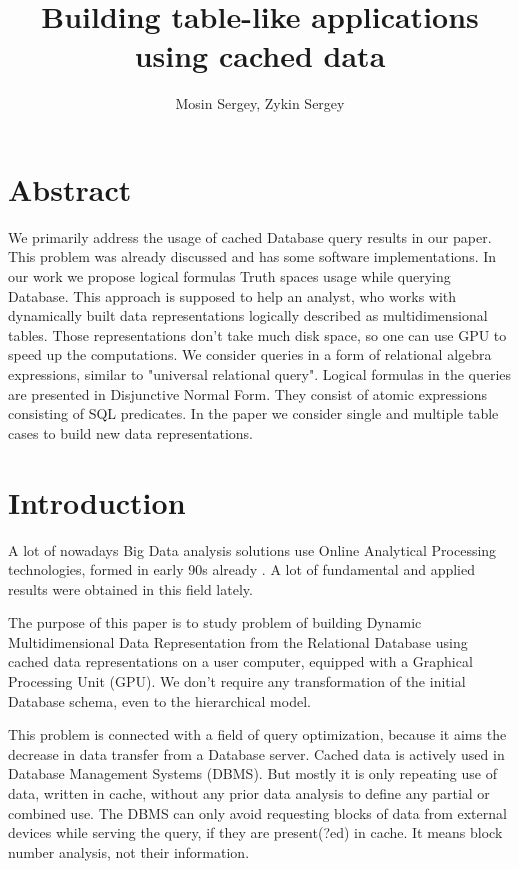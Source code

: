 \documentclass[10pt,a4paper]{article}
\author{Mosin Sergey, Zykin Sergey}
\title{Building table-like applications using cached data}
\author{
Mosin Sergey, Zykin Sergey \footnote{The paper is supported by RFBR grant
#12-07-00066-a}
\date{}
}
\begin{document}
\maketitle

\section{Abstract}
We primarily address the usage of cached Database query results in our paper.
This problem was already discussed and has some software implementations. In our
work we propose logical formulas Truth spaces usage while querying Database.
This approach is supposed to help an analyst, who works with dynamically built
data representations logically described as multidimensional tables. Those
representations don't take much disk space, so one can use GPU to speed up the
computations. We consider queries in a form of relational algebra expressions,
similar to "universal relational query". Logical formulas in the queries are
presented in Disjunctive Normal Form. They consist of atomic expressions
consisting of SQL predicates. In the paper we consider single and multiple table
cases to build new data representations.

\section{Introduction}
A lot of nowadays Big Data analysis solutions use Online Analytical Processing
technologies, formed in early 90s already \cite{codd}. A lot of fundamental
\cite{lecht,lehner,mazon} and applied \cite{vassi, peder, progressive, giorg}
results were obtained in this field lately.

The purpose of this paper is to study problem of building Dynamic
Multidimensional Data Representation from the Relational Database using
cached data representations on a user computer, equipped with a Graphical
Processing Unit (GPU). We don't require any transformation of the initial
Database schema, even to the hierarchical model.

This problem is connected with a field of query optimization, because it aims
the decrease in data transfer from a Database server. Cached data is actively
used in Database Management Systems (DBMS). But mostly it is only repeating use
of data, written in cache, without any prior data analysis to define any partial
or combined use. The DBMS can only avoid requesting blocks of data from external
devices while serving the query, if they are present(?ed) in cache. It means
block number analysis, not their information.
\end{document}
